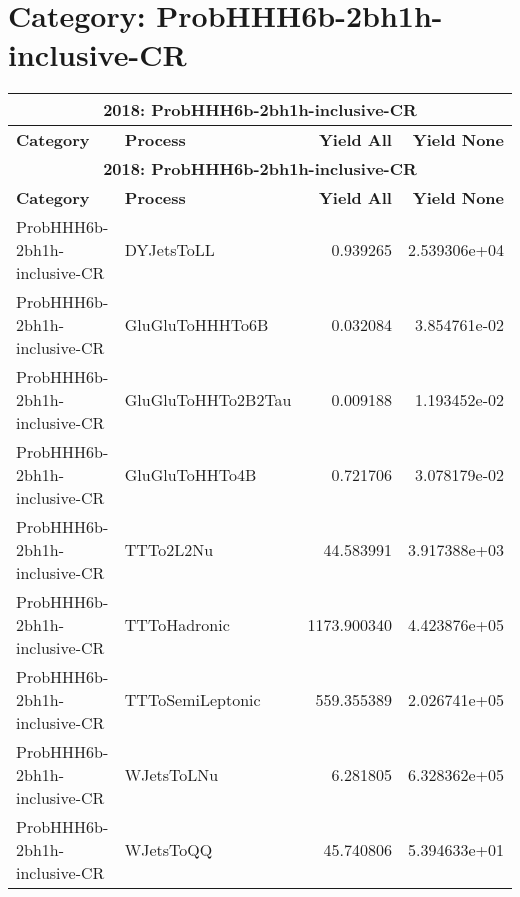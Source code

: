 \documentclass{article}
\begin{document}
\section*{Category: ProbHHH6b-2bh1h-inclusive-CR}
\begin{longtable}[c]{|l|l|r|r|}
\hline
\multicolumn{4}{|c|}{\textbf{2018: ProbHHH6b-2bh1h-inclusive-CR}} \\
\hline
\textbf{Category} & \textbf{Process} & \textbf{Yield All} & \textbf{Yield None} \\
\hline
\endfirsthead
\hline
\multicolumn{4}{|c|}{\textbf{2018: ProbHHH6b-2bh1h-inclusive-CR}} \\
\hline
\textbf{Category} & \textbf{Process} & \textbf{Yield All} & \textbf{Yield None} \\
\hline
\endhead
ProbHHH6b-2bh1h-inclusive-CR & DYJetsToLL & 0.939265 & 2.539306e+04 \\
\hline
ProbHHH6b-2bh1h-inclusive-CR & GluGluToHHHTo6B & 0.032084 & 3.854761e-02 \\
\hline
ProbHHH6b-2bh1h-inclusive-CR & GluGluToHHTo2B2Tau & 0.009188 & 1.193452e-02 \\
\hline
ProbHHH6b-2bh1h-inclusive-CR & GluGluToHHTo4B & 0.721706 & 3.078179e-02 \\
\hline
ProbHHH6b-2bh1h-inclusive-CR & TTTo2L2Nu & 44.583991 & 3.917388e+03 \\
\hline
ProbHHH6b-2bh1h-inclusive-CR & TTToHadronic & 1173.900340 & 4.423876e+05 \\
\hline
ProbHHH6b-2bh1h-inclusive-CR & TTToSemiLeptonic & 559.355389 & 2.026741e+05 \\
\hline
ProbHHH6b-2bh1h-inclusive-CR & WJetsToLNu & 6.281805 & 6.328362e+05 \\
\hline
ProbHHH6b-2bh1h-inclusive-CR & WJetsToQQ & 45.740806 & 5.394633e+01 \\
\hline
\end{longtable}
\end{document}
